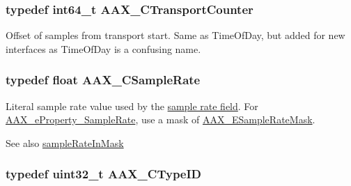 \hypertarget{a00149_ac09cd6857748cc296ac0f8bcc20dc74b}{}
\subsubsection[{A\+A\+X\+\_\+\+C\+Transport\+Counter}]{\setlength{\rightskip}{0pt plus 5cm}typedef int64\+\_\+t {\bf A\+A\+X\+\_\+\+C\+Transport\+Counter}}\label{a00149_ac09cd6857748cc296ac0f8bcc20dc74b}


Offset of samples from transport start. Same as Time\+Of\+Day, but added for new interfaces as Time\+Of\+Day is a confusing name. 

\hypertarget{a00149_a3d9eea08f47e0b0a23432e15baa4e885}{}
\subsubsection[{A\+A\+X\+\_\+\+C\+Sample\+Rate}]{\setlength{\rightskip}{0pt plus 5cm}typedef float {\bf A\+A\+X\+\_\+\+C\+Sample\+Rate}}\label{a00149_a3d9eea08f47e0b0a23432e15baa4e885}


Literal sample rate value used by the \hyperlink{a00088_adbd57beaa0a3143d3cf44b93ecdb59ec}{sample rate field}. For \hyperlink{a00283_a6571f4e41a5dd06e4067249228e2249eac5294e2feb18587d57b6ca0216a6bb1e}{A\+A\+X\+\_\+e\+Property\+\_\+\+Sample\+Rate}, use a mask of \hyperlink{a00206_a5bb98259de21d2c4d04a2d6010d757c7}{A\+A\+X\+\_\+\+E\+Sample\+Rate\+Mask}. 

\begin{DoxySeeAlso}{See also}
\hyperlink{a00149_adec37d03995016a9e25490d5785f0d8b}{sample\+Rate\+In\+Mask} 
\end{DoxySeeAlso}
\hypertarget{a00149_ac678f9c1fbcc26315d209f71a147a175}{}
\subsubsection[{A\+A\+X\+\_\+\+C\+Type\+I\+D}]{\setlength{\rightskip}{0pt plus 5cm}typedef uint32\+\_\+t {\bf A\+A\+X\+\_\+\+C\+Type\+I\+D}}\label{a00149_ac678f9c1fbcc26315d209f71a147a175}


